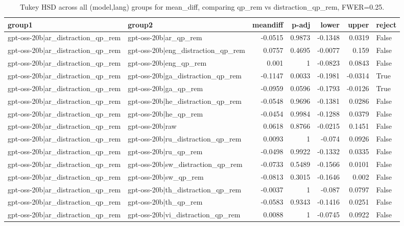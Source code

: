 \begin{table}
\caption{Tukey HSD across all (model,lang) groups for mean_diff, comparing qp_rem vs distraction_qp_rem, FWER=0.25.}
\label{tab:tukey_all_models_all_langs_mean_diff_qp_rem_vs_distraction_qp_rem}
\begin{tabular}{l l r r r r l}
\toprule
group1 & group2 & meandiff & p-adj & lower & upper & reject \\
\midrule
gpt-oss-20b|ar_distraction_qp_rem & gpt-oss-20b|ar_qp_rem & -0.0515 & 0.9873 & -0.1348 & 0.0319 & False \\
gpt-oss-20b|ar_distraction_qp_rem & gpt-oss-20b|eng_distraction_qp_rem & 0.0757 & 0.4695 & -0.0077 & 0.159 & False \\
gpt-oss-20b|ar_distraction_qp_rem & gpt-oss-20b|eng_qp_rem & 0.001 & 1 & -0.0823 & 0.0843 & False \\
gpt-oss-20b|ar_distraction_qp_rem & gpt-oss-20b|ga_distraction_qp_rem & -0.1147 & 0.0033 & -0.1981 & -0.0314 & True \\
gpt-oss-20b|ar_distraction_qp_rem & gpt-oss-20b|ga_qp_rem & -0.0959 & 0.0596 & -0.1793 & -0.0126 & True \\
gpt-oss-20b|ar_distraction_qp_rem & gpt-oss-20b|he_distraction_qp_rem & -0.0548 & 0.9696 & -0.1381 & 0.0286 & False \\
gpt-oss-20b|ar_distraction_qp_rem & gpt-oss-20b|he_qp_rem & -0.0454 & 0.9984 & -0.1288 & 0.0379 & False \\
gpt-oss-20b|ar_distraction_qp_rem & gpt-oss-20b|raw & 0.0618 & 0.8766 & -0.0215 & 0.1451 & False \\
gpt-oss-20b|ar_distraction_qp_rem & gpt-oss-20b|ru_distraction_qp_rem & 0.0093 & 1 & -0.074 & 0.0926 & False \\
gpt-oss-20b|ar_distraction_qp_rem & gpt-oss-20b|ru_qp_rem & -0.0498 & 0.9922 & -0.1332 & 0.0335 & False \\
gpt-oss-20b|ar_distraction_qp_rem & gpt-oss-20b|sw_distraction_qp_rem & -0.0733 & 0.5489 & -0.1566 & 0.0101 & False \\
gpt-oss-20b|ar_distraction_qp_rem & gpt-oss-20b|sw_qp_rem & -0.0813 & 0.3015 & -0.1646 & 0.002 & False \\
gpt-oss-20b|ar_distraction_qp_rem & gpt-oss-20b|th_distraction_qp_rem & -0.0037 & 1 & -0.087 & 0.0797 & False \\
gpt-oss-20b|ar_distraction_qp_rem & gpt-oss-20b|th_qp_rem & -0.0583 & 0.9343 & -0.1416 & 0.0251 & False \\
gpt-oss-20b|ar_distraction_qp_rem & gpt-oss-20b|vi_distraction_qp_rem & 0.0088 & 1 & -0.0745 & 0.0922 & False \\

\end{tabular}
\end{table}
